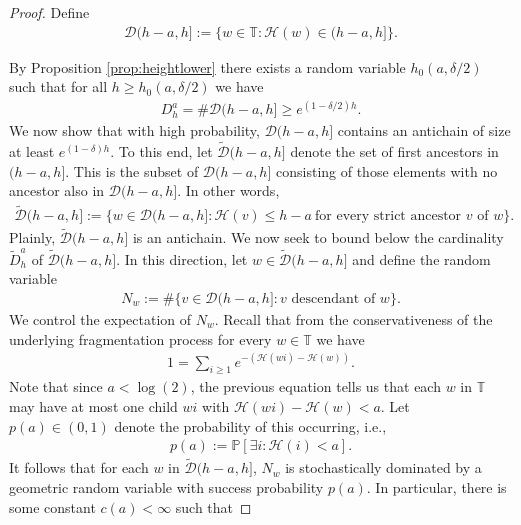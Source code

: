 \documentclass[a4,12pt]{amsart}
\numberwithin{equation}{section}
\begin{document}
	\begin{proof}
		Define
		\begin{align*}
			\mathcal{D}(h-a,h] := \{ w \in \mathbb{T} : \mathcal{H}(w) \in (h-a,h] \}.
		\end{align*}
        
		By Proposition \ref{prop:heightlower} there exists a random variable 
		$h_0(a,\delta/2)$ such that for all $h \geq h_0(a,\delta/2)$ we have
		\begin{align} \label{eq:bc1}
			D_h^a = \# \mathcal{D}(h-a,h] \geq e^{ (1 - \delta/2) h}. 
		\end{align}
		We now show that with high probability, $\mathcal{D}(h-a,h]$ contains 
		an antichain of size at least $e^{(1-\delta)h}$.
		To this end, let $\tilde{\mathcal{D}}(h-a,h]$ denote the set of first ancestors in $(h-a,h]$. 
		This is the subset of $\mathcal{D}(h-a,h]$ consisting of those elements with no 
	ancestor also in $\mathcal{D}(h-a,h]$. In other words,
		\begin{align*}
			\tilde{\mathcal{D}}(h-a,h] := 
			\{w \in \mathcal{D}(h-a,h] : \mathcal{H}(v) \leq h-a ~\text{for every strict ancestor $v$ of $w$} \}.
		\end{align*}
		Plainly, $\tilde{\mathcal{D}}(h-a,h]$ is an antichain. 
		We now seek to bound below the cardinality $\tilde{D}_h^a$ of $\tilde{\mathcal{D}}(h-a,h]$. 
		In this direction, let $w \in \tilde{\mathcal{D}}(h-a,h]$ and define the random variable
		\begin{align*}
			N_w := \# \{ v \in \mathcal{D}(h-a,h] : v \text{ descendant of $w$} \}.
		\end{align*}
		We control the expectation of $N_w$. Recall that from the conservativeness of the underlying fragmentation process for every $w \in \mathbb{T}$ we have
		\begin{align*} 
			1 = \sum_{i \geq 1}e^{ - ( \mathcal{H}(wi) - \mathcal{H}(w) ) }.
		\end{align*}
		Note that since $a < \log(2)$, the previous equation tells us that each $w$ in $\mathbb{T}$ 
		may have at most one child $wi$ with $\mathcal{H}(wi) - \mathcal{H}(w) < a$. 
		Let $p(a) \in (0,1)$ denote the probability of this occurring, i.e.,
		\begin{align*}
			p(a) := \mathbb{P}\left[ \exists i : \mathcal{H}(i)  < a \right].
		\end{align*}
		It follows that for each $w$ in $\tilde{\mathcal{D}}(h-a,h]$, $N_w$ is stochastically dominated by a 
		geometric random variable with success probability $p(a)$. In particular, there is some constant $c(a) < \infty$ such that 

\end{proof}
\end{document}
